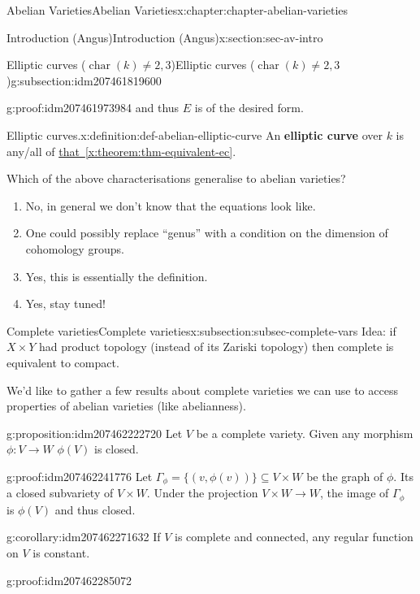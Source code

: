 \documentclass[oneside,10pt,]{book}
\newcommand{\terminology}[1]{\textbf{#1}}
\numberwithin{equation}{section}
\DeclareMathOperator{\characteristic}{char}
\begin{document}
\begin{chapterptx}{Abelian Varieties}{}{Abelian Varieties}{}{}{x:chapter:chapter-abelian-varieties}
\begin{sectionptx}{Introduction (Angus)}{}{Introduction (Angus)}{}{}{x:section:sec-av-intro}
\begin{subsectionptx}{Elliptic curves (\(\characteristic(k) \ne 2,3\))}{}{Elliptic curves (\(\characteristic(k) \ne 2,3\))}{}{}{g:subsection:idm207461819600}
\begin{proofptx}{}{g:proof:idm207461973984}
and thus \(E\) is of the desired form.%
\end{proofptx}
\begin{definition}{Elliptic curves.}{x:definition:def-abelian-elliptic-curve}%
An \terminology{elliptic curve} over \(k\) is any\slash{}all of \hyperref[x:theorem:thm-equivalent-ec]{that~\ref{x:theorem:thm-equivalent-ec}}.%
\end{definition}
Which of the above characterisations generalise to abelian varieties?%
\begin{enumerate}
\item{}No, in general we don't know that the equations look like.%
\item{}One could possibly replace ``genus'' with a condition on the dimension of cohomology groups.%
\item{}Yes, this is essentially the definition.%
\item{}Yes, stay tuned!%
\end{enumerate}
%
\end{subsectionptx}
%
%
\typeout{************************************************}
\typeout{************************************************}
%
\begin{subsectionptx}{Complete varieties}{}{Complete varieties}{}{}{x:subsection:subsec-complete-vars}
Idea: if \(X \times Y\) had product topology (instead of its Zariski topology) then complete is equivalent to compact.%
\par
We'd like to gather a few results about complete varieties we can use to access properties of abelian varieties (like abelianness).%
\begin{proposition}{}{}{g:proposition:idm207462222720}%
Let \(V\) be a complete variety. Given any morphism \(\phi\colon V \to W\) \(\phi (V) \) is closed.%
\end{proposition}
\begin{proofptx}{}{g:proof:idm207462241776}
Let \(\Gamma_\phi = \{(v, \phi(v))\} \subseteq V\times W\) be the graph of \(\phi\). Its a closed subvariety of \(V\times W\). Under the projection \(V\times W \to W\), the image of \(\Gamma_\phi\) is \(\phi(V)\) and thus closed.%
\end{proofptx}
\begin{corollary}{}{}{g:corollary:idm207462271632}%
If \(V\) is complete and connected, any regular function on \(V\) is constant.%
\end{corollary}
\begin{proofptx}{}{g:proof:idm207462285072}

\end{proofptx}
\end{subsectionptx}
\end{sectionptx}
\end{chapterptx}
\end{document}

